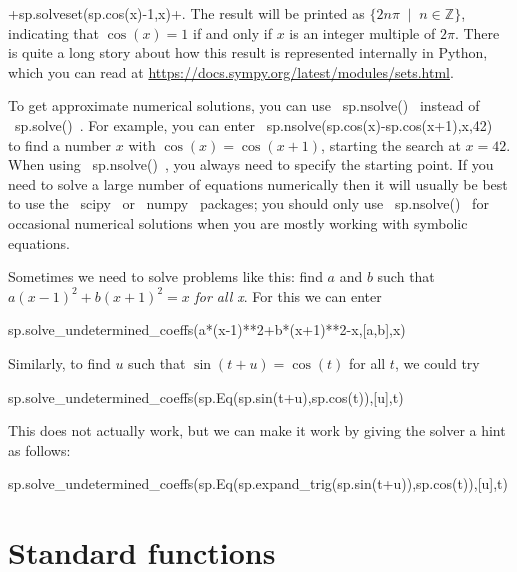 \documentclass[a4paper,10pt]{amsbook}
\begin{document}
\begin{secenum}
  \pcode+sp.solveset(sp.cos(x)-1,x)+.  The result will be printed as
  $\{2n\pi\;\mid\;n\in\mathbb{Z}\}$, indicating that $\cos(x)=1$ if
  and only if $x$ is an integer multiple of $2\pi$.  There is quite a
  long story about how this result is represented internally in
  Python, which you can read at 
  \url{https://docs.sympy.org/latest/modules/sets.html}.
%
 \item\label{fsolve} To get approximate numerical solutions, you can 
  use \pcode~sp.nsolve()~ instead of \pcode~sp.solve()~.  For example,
  you can enter \pcode~sp.nsolve(sp.cos(x)-sp.cos(x+1),x,42)~ to find
  a number $x$ with $\cos(x)=\cos(x+1)$, starting the search at
  $x=42$.  When using \pcode~sp.nsolve()~, you always need to specify
  the starting point.  If you need to solve a large number of
  equations numerically then it will usually be best to use the
  \pcode~scipy~ or \pcode~numpy~ packages; you should only use
  \pcode~sp.nsolve()~ for occasional numerical solutions when you are
  mostly working with symbolic equations.
% 
 \item\label{identity} Sometimes we need to solve problems like
  this: find $a$ and $b$ such that $a(x-1)^2+b(x+1)^2=x$
  \emph{for all x}.  For this we can enter 
  \begin{pcodeblock}
   sp.solve_undetermined_coeffs(a*(x-1)**2+b*(x+1)**2-x,[a,b],x)
  \end{pcodeblock}
  Similarly, to find $u$ such that $\sin(t+u)=\cos(t)$ for all
  $t$, we could try 
  \begin{pcodeblock}
   sp.solve_undetermined_coeffs(sp.Eq(sp.sin(t+u),sp.cos(t)),[u],t)
  \end{pcodeblock}
  This does not actually work, but we can make it work by giving the
  solver a hint as follows:
  \begin{pcodeblock}
   sp.solve_undetermined_coeffs(sp.Eq(sp.expand_trig(sp.sin(t+u)),sp.cos(t)),[u],t)
  \end{pcodeblock}
\end{secenum}

\section{Standard functions}
\end{document}
